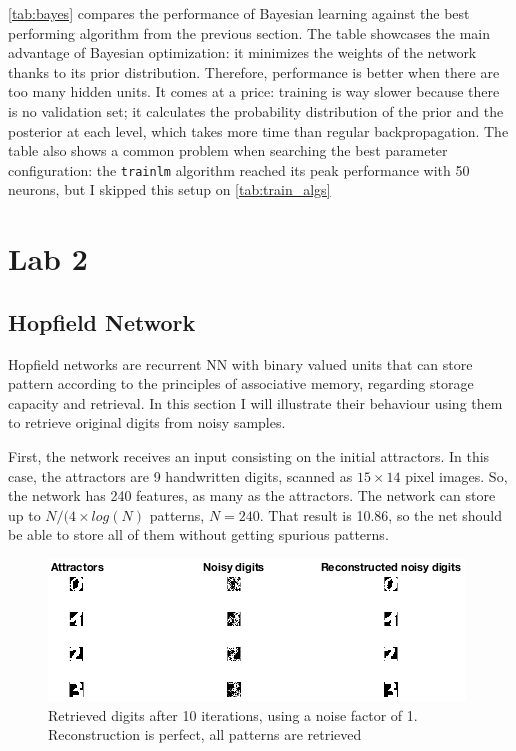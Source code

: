 \documentclass[a4paper, 10pt]{article}
\begin{document}
    \autoref{tab:bayes} compares the performance of Bayesian learning against the 
    best performing algorithm from the previous section. The table showcases the
    main advantage of Bayesian optimization: it minimizes the weights of the
    network thanks to its prior distribution. Therefore, performance is better
    when there are too many hidden units. It comes at a price: training is way slower
    because there is no validation set; it calculates the probability distribution
    of the prior and the posterior at each level, which takes more time than regular
    backpropagation. The table also shows a common problem when searching the best
    parameter configuration: the \texttt{trainlm} algorithm reached its peak 
    performance with 50 neurons, but I skipped this setup on \autoref{tab:train_algs}




  





\newpage
\section{Lab 2}
  \subsection{Hopfield Network}
  Hopfield networks are recurrent NN with binary valued units that can store
  pattern according to the principles of associative memory, regarding storage
  capacity and retrieval. In this section I will illustrate their behaviour using
  them to retrieve original digits from noisy samples.

  First, the network receives an input consisting on the initial attractors. 
  In this case, the attractors are 9 handwritten digits, scanned as $15\times14$
  pixel images. So, the network has 240 features, as many as the attractors.
  The network can store up to $N / (4 \times log(N)$ patterns, $N = 240$. That
  result is 10.86, so the net should be able to store all of them without
  getting spurious patterns.
  \begin{figure}[h]
    \centering
    \includegraphics[width=0.6\linewidth]{lab2/digits/n1i20.png}
    \caption{Retrieved digits after 10 iterations, using a noise factor of 1. 
    Reconstruction is perfect, all patterns are retrieved}
    \label{fig:l2_no_noise}
  \end{figure}
\end{document}
